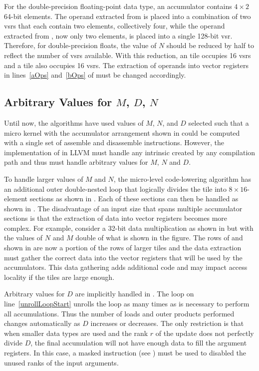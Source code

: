 \documentclass[\main/thesis.tex]{subfiles}
\begin{document}
For the double-precision floating-point data type, an accumulator contains $4 \times 2$ 64-bit elements.
The operand extracted from  is placed into a combination of two \glspl{vsr} that each contain two elements, collectively four, while the operand extracted from , now only two elements, is placed into a single 128-bit \gls{vsr}.
Therefore, for double-precision floats, the value of $N$ should be reduced by half to reflect the number of \glspl{vsr} available.
With this reduction, an  tile occupies 16 \glspl{vsr} and a  tile also occupies 16 \glspl{vsr}.
The extraction of operands into vector registers in lines~\ref{aOps} and~\ref{bOps} of  must be changed accordingly.

\subsection{Arbitrary Values for \texorpdfstring{$M$}{M}, \texorpdfstring{$D$}{D}, \texorpdfstring{$N$}{N}}
\label{sec:arbitraryDims}
Until now, the algorithms have used values of $M$, $N$, and $D$ selected such that a micro kernel with the accumulator arrangement shown in  could be computed with a single set of assemble and disassemble instructions.
However, the implementation of  in LLVM must handle any  \gls{intrinsic} created by any compilation path and thus must handle arbitrary values for $M$, $N$ and $D$.

To handle larger values of $M$ and $N$, the micro-level code-lowering algorithm has an additional outer double-nested loop that logically divides the  tile into $8 \times 16$-element sections as shown in .
Each of these sections can then be handled as shown in .
The disadvantage of an input size that spans multiple accumulator sections is that the extraction of data into vector registers becomes more complex.
For example, consider a 32-bit data multiplication as shown in  but with the values of $N$ and $M$ double of what is shown in the figure.
The rows of  and  shown in  are now a portion of the rows of larger tiles and the data extraction must gather the correct data into the vector registers that will be used by the accumulators.
This data gathering adds additional code and may impact access locality if the tiles are large enough.

Arbitrary values for $D$ are implicitly handled in .
The loop on line~\ref{unrollLoopStart} unrolls the loop as many times as is necessary to perform all accumulations.
Thus the number of loads and outer products performed changes automatically as $D$ increases or decreases.
The only restriction is that when smaller data types are used and the rank $r$ of the update does not perfectly divide $D$, the final accumulation will not have enough data to fill the argument registers.
In this case, a masked instruction (see ) must be used to disabled the unused ranks of the input arguments.
\end{document}
